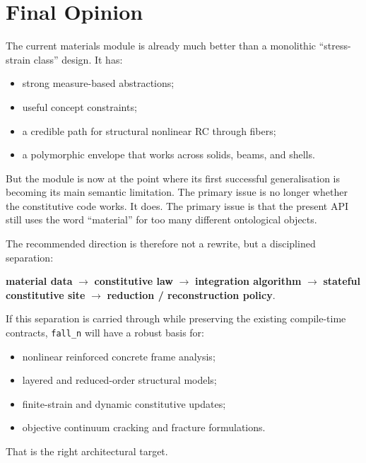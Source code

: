 \section{Final Opinion}

The current materials module is already much better than a monolithic
``stress-strain class'' design.  It has:
\begin{itemize}
  \item strong measure-based abstractions;
  \item useful concept constraints;
  \item a credible path for structural nonlinear RC through fibers;
  \item a polymorphic envelope that works across solids, beams, and shells.
\end{itemize}

But the module is now at the point where its first successful generalisation is
becoming its main semantic limitation.  The primary issue is no longer whether
the constitutive code works.  It does.  The primary issue is that the present
API still uses the word ``material'' for too many different ontological
objects.

The recommended direction is therefore not a rewrite, but a disciplined
separation:
\begin{center}
\textbf{material data}
\(\rightarrow\)
\textbf{constitutive law}
\(\rightarrow\)
\textbf{integration algorithm}
\(\rightarrow\)
\textbf{stateful constitutive site}
\(\rightarrow\)
\textbf{reduction / reconstruction policy}.
\end{center}

If this separation is carried through while preserving the existing
compile-time contracts, \texttt{fall\_n} will have a robust basis for:
\begin{itemize}
  \item nonlinear reinforced concrete frame analysis;
  \item layered and reduced-order structural models;
  \item finite-strain and dynamic constitutive updates;
  \item objective continuum cracking and fracture formulations.
\end{itemize}

That is the right architectural target.
